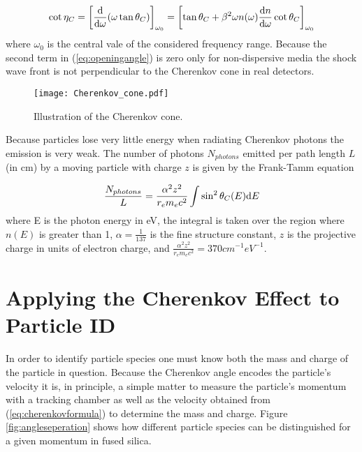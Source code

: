 \begin{equation}
	\cot\eta_C = \left[\frac{\mathrm{d}}{\mathrm{d}\omega}(\omega \tan\theta_{C}) \right]_{\omega_0} = \left[\tan\theta_{C} + \beta^2\omega n(\omega) \frac{\mathrm{d} n}{\mathrm{d}\omega}\cot\theta_{C} \right]_{\omega_0}
	\label{eq:openingangle}
\end{equation}
where $\omega_0$ is the central vale of the considered frequency range. Because the second term in (\ref{eq:openingangle}) is zero only for non-dispersive media the shock wave front is not perpendicular to the Cherenkov cone in real detectors.

\begin{figure}[!htb]
	\centering
	\texttt{[image: Cherenkov\_cone.pdf]}
	\caption{Illustration of the Cherenkov cone.}
	\label{fig:cherenkovcone}
\end{figure}

Because particles lose very little energy when radiating Cherenkov photons the emission is very weak. The number of photons $N_{photons}$ emitted per path length $L$ (in cm) by a moving particle with charge $z$ is given by the Frank-Tamm equation

\begin{equation}
	\frac{N_{photons}}{L} = \frac{\alpha^2 z^2}{r_e m_e c^2} \int \sin^2\theta_{C} (E) \mathrm{d} E
	\label{eq:nphotons}
\end{equation}
%
where E is the photon energy in eV, the integral is taken over the region where $n(E)$ is greater than 1, $\alpha = \frac{1}{137}$ is the fine structure constant, $z$ is the projective charge in units of electron charge, and $\frac{\alpha^2 z^2}{r_e m_e c^2} = 370\unit{cm}^{-1}\unit{eV}^{-1}$.

\section{Applying the Cherenkov Effect to Particle ID}
In order to identify particle species one must know both the mass and charge of the particle in question. Because the Cherenkov angle encodes the particle's velocity it is, in principle, a simple matter to measure the particle's momentum with a tracking chamber as well as the velocity obtained from (\ref{eq:cherenkovformula}) to determine the mass and charge. Figure \ref{fig:angleseperation} shows how different particle species can be distinguished for a given momentum in fused silica.

